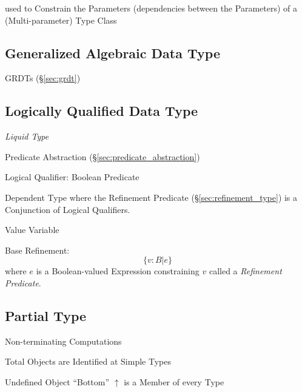 used to Constrain the Parameters (dependencies between the Parameters)
of a (Multi-parameter) Type Class




\subsection{Generalized Algebraic Data Type}\label{sec:gadt}

\fist GRDTs (\S\ref{sec:grdt})



\subsection{Logically Qualified Data Type}
\label{sec:logically_qualified}

\cite{rondon-kawaguchi-jhala08}

\emph{Liquid Type}

Predicate Abstraction (\S\ref{sec:predicate_abstraction})

Logical Qualifier: Boolean Predicate

Dependent Type where the Refinement Predicate
(\S\ref{sec:refinement_type}) is a Conjunction of Logical Qualifiers.

Value Variable

Base Refinement:
\[
  \{ v : B | e \}
\]
where $e$ is a Boolean-valued Expression constraining $v$ called a
\emph{Refinement Predicate}.



\subsection{Partial Type}\label{sec:partial_type}

\cite{thompson99}

Non-terminating Computations

Total Objects are Identified at Simple Types

Undefined Object ``Bottom'' $\uparrow$ is a Member of every Type

